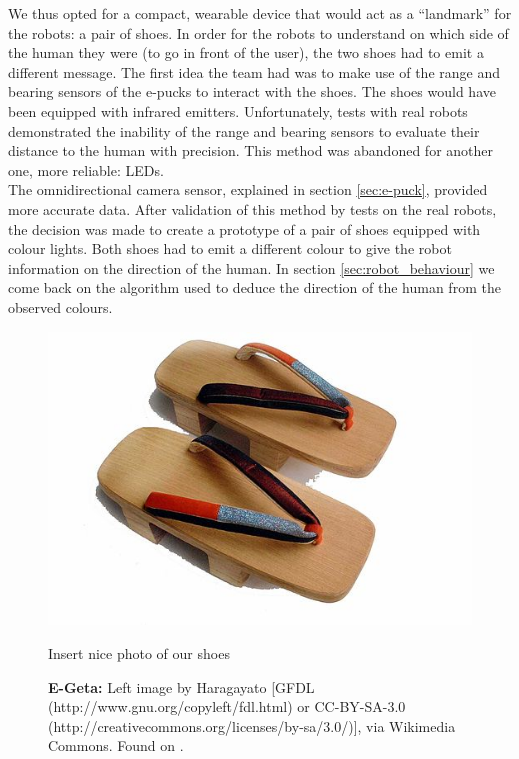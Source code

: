 \documentclass[oneside, a4paper, 12pt]{memoir}
\let\oldCaption\caption
\renewcommand{\caption}[2]{
\oldCaption[#1]{{\small\sffamily\bfseries #1:} #2}
}
\begin{document}
	We thus opted for a compact, wearable device that would act as a \enquote{landmark} for the robots: a pair of shoes. In order for the robots to understand on which side of the human they were (to go in front of the user), the two shoes had to emit a different message. The first idea the team had was to make use of the range and bearing sensors of the e-pucks to interact with the shoes. The shoes would have been equipped with infrared emitters. Unfortunately, tests with real robots demonstrated the inability of the range and bearing sensors to evaluate their distance to the human with precision. This method was abandoned for another one, more reliable: LEDs.\\
	
	The omnidirectional camera sensor, explained in section \ref{sec:e-puck}, provided more accurate data. After validation of this method by tests on the real robots, the decision was made to create a prototype of a pair of shoes equipped with colour lights. Both shoes had to emit a different colour to give the robot information on the direction of the human. In section \ref{sec:robot_behaviour} we come back on the algorithm used to deduce the direction of the human from the observed colours.\\
	

	
	\begin{figure}
		\begin{minipage}[c]{0.49\textwidth}
			\includegraphics[width=\textwidth]{images/512px-Geta.jpg}
		\end{minipage}
		\hfill
		\begin{minipage}[c]{0.49\textwidth}
			Insert nice photo of our shoes
		\end{minipage}
		
		\caption{E-Geta}{Left image by Haragayato [GFDL (http://www.gnu.org/copyleft/fdl.html) or CC-BY-SA-3.0 (http://creativecommons.org/licenses/by-sa/3.0/)], via Wikimedia Commons. Found on \citet{wiki:001}.}
		\label{fig:e-geta}
	\end{figure}
	
\end{document}
